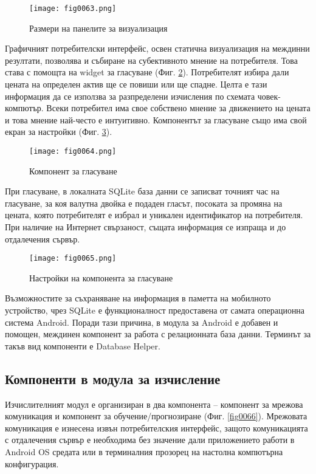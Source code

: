\begin{figure}[H]
  \centering
  \texttt{[image: fig0063.png]}
  \caption{Размери на панелите за визуализация}
\label{fig0063}
\end{figure}

Графичният потребителски интерфейс, освен статична визуализация на междинни резултати, позволява и събиране на субективното мнение на потребителя. Това става с помощта на widget за гласуване (Фиг. \ref{fig0064}). Потребителят избира дали цената на определен актив ще се повиши или ще спадне. Целта е тази информация да се използва за разпределени изчисления по схемата човек-компютър. Всеки потребител има свое собствено мнение за движението на цената и това мнение най-често е интуитивно.  Компонентът за гласуване също има свой екран за настройки (Фиг. \ref{fig0065}).

\begin{figure}[H]
  \centering
  \texttt{[image: fig0064.png]}
  \caption{Компонент за гласуване}
\label{fig0064}
\end{figure}

При гласуване, в локалната SQLite база данни се записват точният час на гласуване, за коя валутна двойка е подаден гласът, посоката за промяна на цената, която потребителят е избрал и уникален идентификатор на потребителя. При наличие на Интернет свързаност, същата информация се изпраща и до отдалечения сървър. 

\begin{figure}[H]
  \centering
  \texttt{[image: fig0065.png]}
  \caption{Настройки на компонента за гласуване}
\label{fig0065}
\end{figure}

Възможностите за съхраняване на информация в паметта на мобилното устройство, чрез SQLite е функционалност предоставена от самата операционна система Android. Поради тази причина, в модула за Android е добавен и помощен, междинен компонент за работа с релационната база данни. Терминът за такъв вид компоненти е Database Helper.

\subsection{Компоненти в модула за изчисление}

Изчислителният модул е организиран в два компонента – компонент за мрежова комуникация и компонент за обучение/прогнозиране (Фиг. \ref{fig0066}). Мрежовата комуникация е изнесена извън потребителския интерфейс, защото комуникацията с отдалечения сървър е необходима без значение дали приложението работи в Android OS средата или в терминалния прозорец на настолна компютърна конфигурация. 

